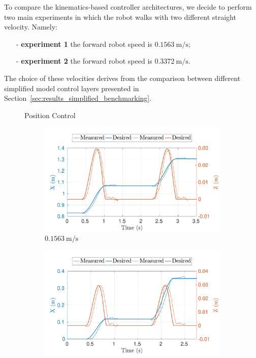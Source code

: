 To compare the kinematics-based controller architectures, we decide to perform two main experiments in which the robot walks with two different straight velocity. Namely:
\begin{itemize}
    \item[-] \textbf{experiment 1} the forward robot speed is $\SI{0.1563}{\meter \per \second}$;
    \item[-] \textbf{experiment 2} the forward robot speed is $\SI{0.3372}{\meter \per \second}$.
\end{itemize}
The choice of these velocities derives from the comparison between different simplified model control layers presented in Section~\ref{sec:results_simplified_benchmarking}.

\begin{figure}[t]
    \centering
        \begin{myframe}{Position Control}
            \begin{subfigure}[t]{0.49\columnwidth}
            \centering
            \includegraphics[width=\textwidth]{chapter_wbc_benchmarking/figures/inst_pos-min_vel-lf.pdf}
            \caption{$\SI{0.1563}{\meter \per \second}$}
            \label{fig:inst_pos-min_vel-lf}
            \end{subfigure}
            \begin{subfigure}[t]{0.49\columnwidth}
            \centering
            \includegraphics[width=\textwidth]{chapter_wbc_benchmarking/figures/inst_pos-max_vel-lf.pdf}

\end{subfigure}
\end{myframe}
\end{figure}
